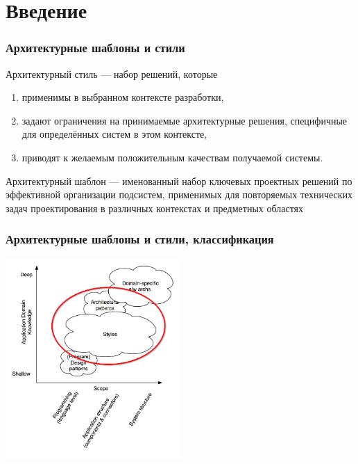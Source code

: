 \documentclass{../../slides-style}
\begin{document}
    
    \begin{frame}[plain]
        \titlepage
    \end{frame}

    \section{Введение}

    \begin{frame}
        \frametitle{Архитектурные шаблоны и стили}
        Архитектурный стиль --- набор решений, которые
        \begin{enumerate}
            \item применимы в выбранном контексте разработки,
            \item задают ограничения на принимаемые архитектурные решения, специфичные для определённых систем в этом контексте,
            \item приводят к желаемым положительным качествам получаемой системы.
        \end{enumerate}
        Архитектурный шаблон --- именованный набор ключевых проектных решений по эффективной организации подсистем, применимых для повторяемых технических задач проектирования в различных контекстах и предметных областях
    \end{frame}

    \begin{frame}
        \frametitle{Архитектурные шаблоны и стили, классификация}
        \begin{center}
            \includegraphics[width=0.5\textwidth]{architecturalStylesHighlighted.png}
        \end{center}
    \end{frame}
\end{document}
